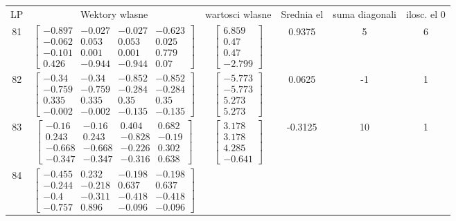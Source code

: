 \documentclass[a4paper,12pt]{article}
\begin{document}
\bgroup {} \vspace{0.2in} \begin{tabular}{c c c c c c}
LP &Wektory wlasne & wartosci wlasne & Srednia el & suma diagonali & ilosc. el 0\\
81
&
$\begin{bmatrix} -0.897 & -0.027 & -0.027 & -0.623 \\ -0.062 & 0.053 & 0.053 & 0.025 \\ -0.101 & 0.001 & 0.001 & 0.779 \\ 0.426 & -0.944 & -0.944 & 0.07 \end{bmatrix}$
&
$\begin{bmatrix} 6.859 \\ 0.47 \\ 0.47 \\ -2.799 \end{bmatrix}$
&
0.9375
&
5
&
6
\\
82
&
$\begin{bmatrix} -0.34 & -0.34 & -0.852 & -0.852 \\ -0.759 & -0.759 & -0.284 & -0.284 \\ 0.335 & 0.335 & 0.35 & 0.35 \\ -0.002 & -0.002 & -0.135 & -0.135 \end{bmatrix}$
&
$\begin{bmatrix} -5.773 \\ -5.773 \\ 5.273 \\ 5.273 \end{bmatrix}$
&
0.0625
&
-1
&
1
\\
83
&
$\begin{bmatrix} -0.16 & -0.16 & 0.404 & 0.682 \\ 0.243 & 0.243 & -0.828 & -0.19 \\ -0.668 & -0.668 & -0.226 & 0.302 \\ -0.347 & -0.347 & -0.316 & 0.638 \end{bmatrix}$
&
$\begin{bmatrix} 3.178 \\ 3.178 \\ 4.285 \\ -0.641 \end{bmatrix}$
&
-0.3125
&
10
&
1
\\
84
&
$\begin{bmatrix} -0.455 & 0.232 & -0.198 & -0.198 \\ -0.244 & -0.218 & 0.637 & 0.637 \\ -0.4 & -0.311 & -0.418 & -0.418 \\ -0.757 & 0.896 & -0.096 & -0.096 \end{bmatrix}$

\end{tabular}
\end{document}
